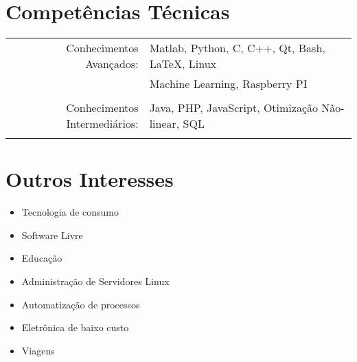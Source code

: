 \documentclass[a4paper,10pt]{article}
\begin{document}
\section{Competências Técnicas}
\begin{tabular}{rl}

    Conhecimentos Avançados:        & Matlab, Python, C, C++, Qt, Bash, \LaTeX, Linux\\
                                    & Machine Learning, Raspberry PI\\
                                    &\\

    Conhecimentos Intermediários:   & Java, PHP, JavaScript, Otimização Não-linear, SQL\\
                                    &\\

\end{tabular}

\section{Outros Interesses}

\begin{itemize}
    \item Tecnologia de consumo
    \item Software Livre
    \item Educação
    \item Administração de Servidores Linux
    \item Automatização de processos
    \item Eletrônica de baixo custo
    \item Viagens
\end{itemize}



\vfill
\hrulefill\\
\center{\footnotesize{\today}}
\end{document}
